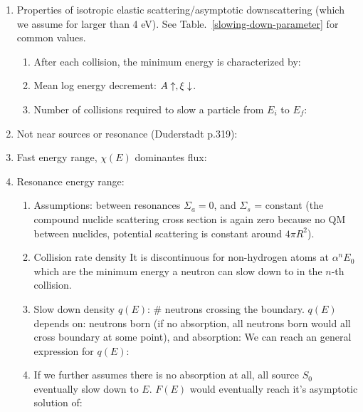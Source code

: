 \documentclass{school-22.211-notes}
\begin{document}


\clearpage
{}
\begin{enumerate}
\item Properties of isotropic elastic scattering/asymptotic downscattering (which we assume for larger than 4 eV). See Table.~\ref{slowing-down-parameter} for common values. 
  \begin{enumerate}
    \item After each collision, the minimum energy is characterized by: 
      
    \item Mean log energy decrement: $A \uparrow, \xi \downarrow$. 

    \item Number of collisions required to slow a particle from $E_i$ to $E_f$:
  \end{enumerate}

\item Not near sources or resonance (Duderstadt p.319): 

\item Fast energy range, $\chi(E)$ dominantes flux:

\item Resonance energy range: 
  \begin{enumerate}
    \item Assumptions: between resonances $\Sigma_a =0$, and $\Sigma_s$ = constant (the compound nuclide scattering cross section is again zero because no QM between nuclides, potential scattering is constant around $4 \pi R^2$). 

    \item Collision rate density 
      It is discontinuous for non-hydrogen atoms at $\alpha^n E_0$ which are the minimum energy a neutron can slow down to in the $n$-th collision. 

    \item Slow down density $q(E)$: \# neutrons crossing the boundary. $q(E)$ depends on: neutrons born (if no absorption, all neutrons born would all cross boundary at some point), and absorption: 
      We can reach an general expression for $q(E)$:

    \item If we further assumes there is no absorption at all, all source $S_0$ eventually slow down to $E$. $F(E)$ would eventually reach it's asymptotic solution of: 
  \end{enumerate}
\end{enumerate}
\end{document}
